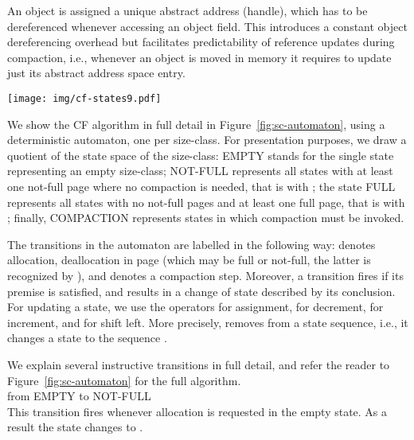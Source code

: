 \documentclass{amsart}
\begin{document}
An object is assigned a unique abstract address (handle), which has to be
dereferenced whenever accessing an object field. This introduces a constant
object dereferencing overhead but facilitates predictability of reference
updates during compaction, i.e., whenever an object is moved in memory it
requires to update just its abstract address space entry.


\begin{figure*}
    \begin{center}
        \texttt{[image: img/cf-states9.pdf]}
        \caption{Size-class automaton with }
            \label{fig:sc-automaton}
    \end{center}
\end{figure*}

We show the CF algorithm in full detail in
Figure~\ref{fig:sc-automaton}, using a deterministic automaton, one
per size-class. For presentation purposes, we draw a quotient of the
state space of the size-class: {\scriptsize{\textsf{EMPTY}}} stands
for the single state  representing an empty
size-class; {\scriptsize{\textsf{NOT-FULL}}} represents all states
with at least one not-full page where no compaction is needed, that is
 with ; the
state {\scriptsize{\textsf{FULL}}} represents all states with no
not-full pages and at least one full page, that is  with ; finally, {\scriptsize{\textsf{COMPACTION}}}
represents states  in which compaction must be invoked.

The transitions in the automaton are labelled in the following way:
 denotes allocation,  deallocation in page  (which may be
full or not-full, the latter is recognized by ), and 
denotes a compaction step. Moreover, a transition fires if its premise
is satisfied, and results in a change of state described by its
conclusion. For updating a state, we use the operators 
for assignment,  for decrement,  for
increment, and  for shift left. More precisely,
 removes  from a state
sequence, i.e., it changes a state  to the sequence .


We explain several instructive transitions in full detail, and refer
the reader to Figure~\ref{fig:sc-automaton} for the full algorithm.\\





\noindent  from
{\scriptsize{\textsf{EMPTY}}} to {\scriptsize{\textsf{NOT-FULL}}}\\

\noindent This transition fires whenever allocation is
requested in the
empty state. As a result the state changes to .\\
\end{document}
